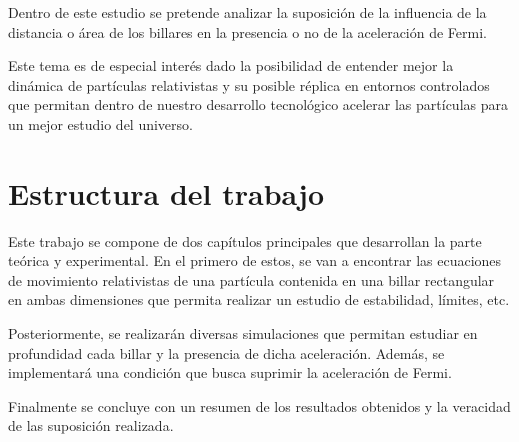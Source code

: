 \vspace{3mm}

Dentro de este estudio se pretende analizar la suposición de la influencia de la distancia o área de los billares en la presencia o no de la aceleración de Fermi. 

\vspace{3mm}

Este tema es de especial interés dado la posibilidad de entender mejor la dinámica de partículas relativistas y su posible réplica en entornos controlados que permitan dentro de nuestro desarrollo tecnológico acelerar las partículas para un mejor estudio del universo. 

\section{Estructura del trabajo}

Este trabajo se compone de dos capítulos principales que desarrollan la parte teórica y experimental. En el primero de estos, se van a encontrar las ecuaciones de movimiento relativistas de una partícula contenida en una billar rectangular en ambas dimensiones que permita realizar un estudio de estabilidad, límites, etc.

\vspace{3mm}

Posteriormente, se realizarán diversas simulaciones que permitan estudiar en profundidad cada billar y la presencia de dicha aceleración. Además, se implementará una condición que busca suprimir la aceleración de Fermi. 

\vspace{3mm}

Finalmente se concluye con un resumen de los resultados obtenidos y la veracidad de las suposición realizada.

%